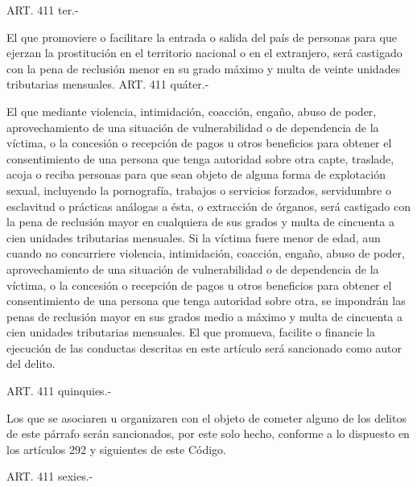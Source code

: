     ART. 411 ter.-

    El que promoviere o facilitare la entrada o salida del país de personas para que ejerzan la prostitución en el territorio nacional o en el extranjero, será castigado con la pena de reclusión menor en su grado máximo y multa de veinte unidades tributarias mensuales.
    ART. 411 quáter.-

    El que mediante violencia, intimidación, coacción, engaño, abuso de poder, aprovechamiento de una situación de vulnerabilidad o de dependencia de la víctima, o la concesión o recepción de pagos u otros beneficios para obtener el consentimiento de una persona que tenga autoridad sobre otra capte, traslade, acoja o reciba personas para que sean objeto de alguna forma de explotación sexual, incluyendo la pornografía, trabajos o servicios forzados, servidumbre o esclavitud o prácticas análogas a ésta, o extracción de órganos, será castigado con la pena de reclusión mayor en cualquiera de sus grados y multa de cincuenta a cien unidades tributarias mensuales.
    Si la víctima fuere menor de edad, aun cuando no concurriere violencia, intimidación, coacción, engaño, abuso de poder, aprovechamiento de una situación de vulnerabilidad o de dependencia de la víctima, o la concesión o recepción de pagos u otros beneficios para obtener el consentimiento de una persona que tenga autoridad sobre otra, se impondrán las penas de reclusión mayor en sus grados medio a máximo y multa de cincuenta a cien unidades tributarias mensuales.
    El que promueva, facilite o financie la ejecución de las conductas descritas en este artículo será sancionado como autor del delito.


    ART. 411 quinquies.-

    Los que se asociaren u organizaren con el objeto de cometer alguno de los delitos de este párrafo serán sancionados, por este solo hecho, conforme a lo dispuesto en los artículos 292 y siguientes de este Código.

    ART. 411 sexies.-

